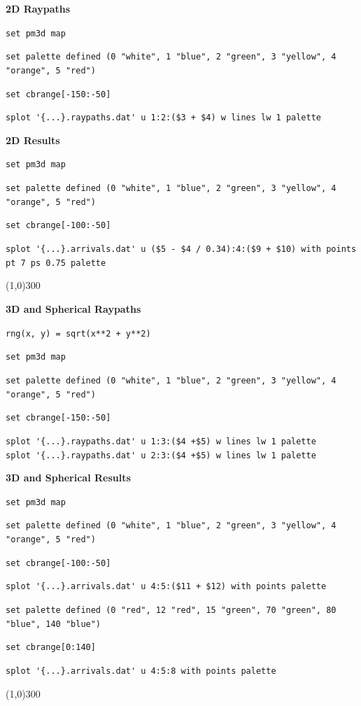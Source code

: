 \documentclass[10pt]{article}
\begin{document}
\begin{footnotesize}

\hspace{-0.25in}\textbf{2D Raypaths}

\verb=set pm3d map=

\verb=set palette defined (0 "white", 1 "blue", 2 "green", 3 "yellow", 4 "orange", 5 "red")=

\verb=set cbrange[-150:-50]=

\verb#splot '{...}.raypaths.dat' u 1:2:($3 + $4) w lines lw 1 palette#

\vspace{0.015\textheight}
\hspace{-0.25in}\textbf{2D Results}

\verb=set pm3d map=

\verb=set palette defined (0 "white", 1 "blue", 2 "green", 3 "yellow", 4 "orange", 5 "red")=

\verb=set cbrange[-100:-50]=

\verb=splot '{...}.arrivals.dat' u ($5 - $4 / 0.34):4:($9 + $10) with points pt 7 ps 0.75 palette= \newline

\vspace*{-5pt}
\begin{center}\line(1,0){300}\end{center}

\hspace{-0.25in}\textbf{3D and Spherical  Raypaths}

\verb#rng(x, y) = sqrt(x**2 + y**2)#

\verb=set pm3d map=

\verb=set palette defined (0 "white", 1 "blue", 2 "green", 3 "yellow", 4 "orange", 5 "red")=

\verb=set cbrange[-150:-50]=

\verb#splot '{...}.raypaths.dat' u 1:3:($4 +$5) w lines lw 1 palette# \\
\verb#splot '{...}.raypaths.dat' u 2:3:($4 +$5) w lines lw 1 palette#

\vspace{0.015\textheight}
\hspace{-0.25in}\textbf{3D and Spherical Results}

\verb=set pm3d map=

\verb=set palette defined (0 "white", 1 "blue", 2 "green", 3 "yellow", 4 "orange", 5 "red")=

\verb=set cbrange[-100:-50]=

\verb=splot '{...}.arrivals.dat' u 4:5:($11 + $12) with points palette= 

\verb=set palette defined (0 "red", 12 "red", 15 "green", 70 "green", 80 "blue", 140 "blue")=

\verb=set cbrange[0:140]=

\verb=splot '{...}.arrivals.dat' u 4:5:8 with points palette=

\vspace*{-5pt}
\begin{center}\line(1,0){300}\end{center}
\end{footnotesize}
\end{document}
